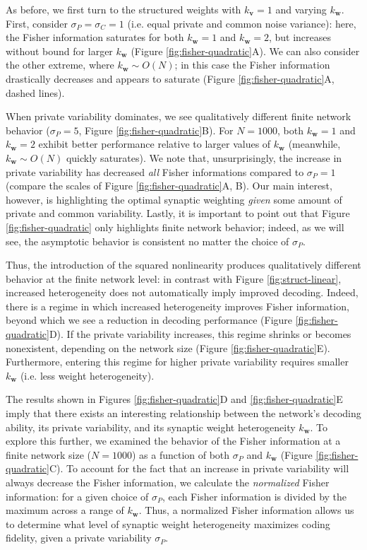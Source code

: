 \documentclass[12pt]{article}
\begin{document}
As before, we first turn to the structured weights with $k_{\mathbf{v}}=1$ and varying $k_{\mathbf{w}}$. First, consider $\sigma_P= \sigma_C=1$ (i.e. equal private and common noise variance): here, the Fisher information saturates for both $k_{\mathbf{w}}=1$ and $k_{\mathbf{w}}=2$, but increases without bound for larger $k_{\mathbf{w}}$ (Figure \ref{fig:fisher-quadratic}A). We can also consider the other extreme, where $k_{\mathbf{w}}\sim O(N)$; in this case the Fisher information drastically decreases and  appears to saturate (Figure \ref{fig:fisher-quadratic}A, dashed lines). 
	
When private variability dominates, we see qualitatively different finite network behavior ($\sigma_P=5$, Figure \ref{fig:fisher-quadratic}B). For  $N=1000$,  both $k_{\mathbf{w}}=1$ and $k_{\mathbf{w}}=2$ exhibit better performance relative to larger values of $k_{\mathbf{w}}$ (meanwhile, $k_{\mathbf{w}} \sim O(N)$  quickly saturates). We note that, unsurprisingly, the increase in private variability has decreased \textit{all} Fisher informations compared to $\sigma_P=1$ (compare the scales of Figure \ref{fig:fisher-quadratic}A, B). Our main interest, however, is highlighting the optimal synaptic weighting \textit{given} some amount of private and common variability. Lastly, it is important to point out that Figure \ref{fig:fisher-quadratic} only highlights finite network behavior; indeed, as we will see, the asymptotic behavior is consistent no matter the choice of $\sigma_P$.
	
Thus, the introduction of the squared nonlinearity produces qualitatively different behavior at the finite network level: in contrast with Figure \ref{fig:struct-linear}, increased heterogeneity does not automatically imply improved decoding. Indeed, there is a regime in which increased heterogeneity improves Fisher information, beyond which we see a reduction in decoding performance (Figure \ref{fig:fisher-quadratic}D). If the private variability increases, this regime shrinks or becomes nonexistent, depending on the network size (Figure \ref{fig:fisher-quadratic}E). Furthermore, entering this regime for higher private variability requires smaller $k_{\mathbf{w}}$ (i.e. less weight heterogeneity). 
	
The results shown in Figures \ref{fig:fisher-quadratic}D and  \ref{fig:fisher-quadratic}E imply that there exists an interesting relationship between the network's decoding ability, its private variability, and its synaptic weight heterogeneity $k_{\mathbf{w}}$. To explore this further, we examined the behavior of the Fisher information at a finite network size ($N=1000$) as a function of both $\sigma_P$ and $k_{\mathbf{w}}$ (Figure \ref{fig:fisher-quadratic}C).  To account for the fact that an increase in private variability will always decrease the Fisher information, we calculate the \textit{normalized} Fisher information: for a given choice of $\sigma_P$, each Fisher information is divided by the maximum across a range of $k_{\mathbf{w}}$. Thus, a normalized Fisher information allows us to determine what level of synaptic weight heterogeneity maximizes coding fidelity, given a private variability $\sigma_P$. 
	
\end{document}

